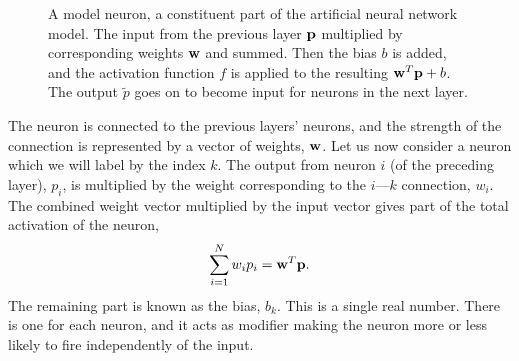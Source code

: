 \documentclass[a4paper, twocolumn]{article}
\begin{document}
\begin{figure}
\begin{centering}
\caption{A model neuron, a constituent part of the artificial neural network model. The input from the previous layer ${\bf p}$ multiplied by corresponding weights ${\bf w}$ and summed. Then the bias $b$ is added, and the activation function $f$ is applied to the resulting ${\bf w}^T{\bf p}+b$. The output $\tilde p$ goes on to become input for neurons in the next layer. \label{fig:neuron}}
\end{centering}
\end{figure}
The neuron is connected to the previous layers' neurons, and the strength of the connection is represented by a vector of weights, ${\bf w}$. Let us now consider a neuron which we will label by the index $k$. The output from neuron $i$ (of the preceding layer), $p_i$, is multiplied by the weight corresponding to the $i$\----$k$ connection, $w_i$. The combined weight vector multiplied by the input vector gives part of the total activation of the neuron, 
\begin{align}
\sum_{i=1}^Nw_ip_i = {\bf w}^T{\bf p}.
\end{align}
The remaining part is known as the bias, $b_k$. This is a single real number. There is one for each neuron, and it acts as modifier making the neuron more or less likely to fire independently of the input. 
\end{document}
